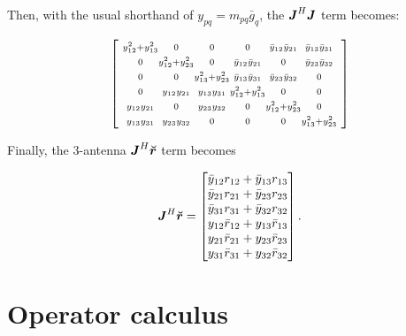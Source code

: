 \documentclass[useAMS,usenatbib]{mn2e}
\makeatletter
\newcommand{\mat}[1]{{\bmath{#1}}}
\newcommand{\JJ}{\mat{J}} %
\newcommand{\Matrix}[2]{\left [ \begin{array}{@{}#1@{}}#2\end{array} \right ]}
\newcommand{\AUG}[1]{\bmath{\breve{#1}}}
\newcommand{\Rr}{\AUG{r}}
\numberwithin{equation}{section}
\makeatother
\begin{document}
Then, with the usual shorthand of $y_{pq} = m_{pq} \bar{g}_q$, the
$\JJ^H\JJ$ term becomes:

\begin{equation}
\label{eq:JHJ:3ant}
\Matrix{@{~}c@{}c@{}c@{}c@{}c@{}c@{~}}{
\scriptstyle\yysq{12}{13} &\scriptstyle 0             &\scriptstyle 0             &\scriptstyle 0             &\scriptstyle \bb{1}{2}       &\scriptstyle \bb{1}{3} \\
\scriptstyle0             &\scriptstyle \yysq{12}{23} &\scriptstyle 0             &\scriptstyle \bb{1}{2}       &\scriptstyle 0             &\scriptstyle \bb{2}{3} \\
\scriptstyle0             &\scriptstyle 0             &\scriptstyle \yysq{13}{23} &\scriptstyle \bb{1}{3}       &\scriptstyle \bb{2}{3}       &\scriptstyle 0       \\
\scriptstyle0             &\scriptstyle \bbb{1}{2}      &\scriptstyle \bbb{1}{3}      &\scriptstyle \yysq{12}{13} &\scriptstyle 0             &\scriptstyle 0       \\ 
\scriptstyle\bbb{1}{2}      &\scriptstyle 0             &\scriptstyle \bbb{2}{3}      &\scriptstyle 0             &\scriptstyle \yysq{12}{23} &\scriptstyle 0 \\
\scriptstyle\bbb{1}{3}      &\scriptstyle \bbb{2}{3}      &\scriptstyle 0             &\scriptstyle 0             &\scriptstyle 0             &\scriptstyle  \yysq{13}{23} \\
}
\end{equation}

Finally, the 3-antenna $\JJ^H\Rr$ term becomes

\begin{equation}
\label{eq:JHR:3ant}
\JJ^H\Rr = \Matrix{c}{
\bar{y}_{12} r_{12} + \bar{y}_{13} r_{13} \\
\bar{y}_{21} r_{21} + \bar{y}_{23} r_{23} \\
\bar{y}_{31} r_{31} + \bar{y}_{32} r_{32} \\
y_{12} \bar{r}_{12} + y_{13} \bar{r}_{13}   \\
y_{21} \bar{r}_{21} + y_{23} \bar{r}_{23}   \\
y_{31} \bar{r}_{31} + y_{32} \bar{r}_{32}   \\
}.
\end{equation}


\newcommand{\WW}{\mathbb{W}}
\newcommand{\WWi}{\mathbb{W}^{-1}}

\section{Operator calculus}
\label{sec:opcalculus}
\end{document}

